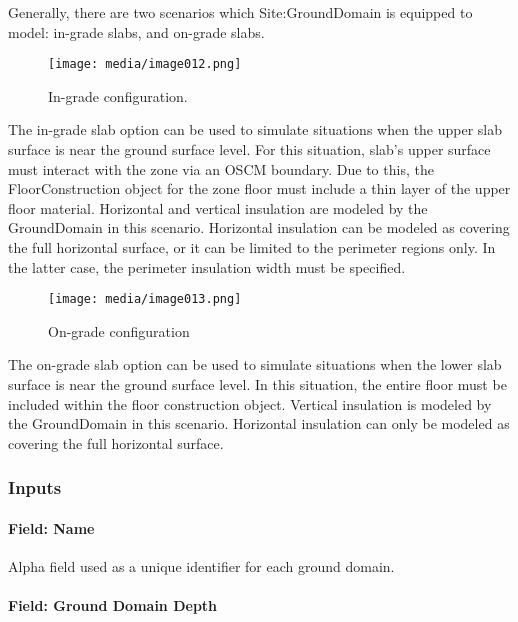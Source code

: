 Generally, there are two scenarios which Site:GroundDomain is equipped to model: in-grade slabs, and on-grade slabs.

\begin{figure}[htbp]
\centering
\texttt{[image: media/image012.png]}
\caption{In-grade configuration. \protect \label{fig:in-grade-configuration}}
\end{figure}

The in-grade slab option can be used to simulate situations when the upper slab surface is near the ground surface level. For this situation, slab's upper surface must interact with the zone via an OSCM boundary. Due to this, the FloorConstruction object for the zone floor must include a thin layer of the upper floor material. Horizontal and vertical insulation are modeled by the GroundDomain in this scenario. Horizontal insulation can be modeled as covering the full horizontal surface, or it can be limited to the perimeter regions only. In the latter case, the perimeter insulation width must be specified.

\begin{figure}[htbp]
\centering
\texttt{[image: media/image013.png]}
\caption{On-grade configuration \protect \label{fig:on-grade-configuration}}
\end{figure}

The on-grade slab option can be used to simulate situations when the lower slab surface is near the ground surface level. In this situation, the entire floor must be included within the floor construction object. Vertical insulation is modeled by the GroundDomain in this scenario. Horizontal insulation can only be modeled as covering the full horizontal surface.

\subsubsection{Inputs}\label{inputs-16-006}

\paragraph{Field: Name}\label{field-name-8-009}

Alpha field used as a unique identifier for each ground domain.

\paragraph{Field: Ground Domain Depth}\label{field-ground-domain-depth}

